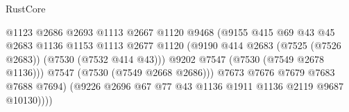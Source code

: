 \begin{lexlean}{RustCore}
\begin{coremodule}
                                                  @1123
                                                  @2686
                                                  @2693
                                                  @1113
                                                  @2667
                                                  @1120
                                                  @9468
                                                  (@9155
                                                    @415
                                                    @69
                                                    @43
                                                    @45
                                                    @2683
                                                    @1136
                                                    @1153
                                                    @1113
                                                    @2677
                                                    @1120
                                                    (@9190
                                                      @414
                                                      @2683
                                                      (@7525 (@7526 @2683))
                                                      (@7530 (@7532 @414 @43)))
                                                    @9202
                                                    @7547
                                                    (@7530 (@7549 @2678 @1136)))
                                                  @7547
                                                  (@7530 (@7549 @2668 @2686)))
                                                @7673
                                                @7676
                                                @7679
                                                @7683
                                                @7688
                                                @7694)
                                              (@9226
                                                @2696
                                                @67
                                                @77
                                                @43
                                                @1136
                                                @1911
                                                @1136
                                                @2119
                                                @9687
                                                @10130))))

\end{coremodule}
\end{lexlean}
